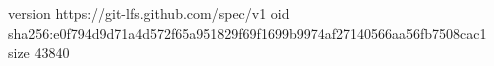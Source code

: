 version https://git-lfs.github.com/spec/v1
oid sha256:e0f794d9d71a4d572f65a951829f69f1699b9974af27140566aa56fb7508cac1
size 43840
